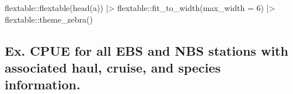 \documentclass[
  letterpaper,
  oneside,
  open=any]{scrbook}
\newenvironment{Shaded}{\begin{snugshade}}{\end{snugshade}}
\newcommand{\AttributeTok}[1]{\textcolor[rgb]{0.40,0.45,0.13}{#1}}
\newcommand{\DecValTok}[1]{\textcolor[rgb]{0.68,0.00,0.00}{#1}}
\newcommand{\FunctionTok}[1]{\textcolor[rgb]{0.28,0.35,0.67}{#1}}
\newcommand{\NormalTok}[1]{\textcolor[rgb]{0.00,0.23,0.31}{#1}}
\newcommand{\SpecialCharTok}[1]{\textcolor[rgb]{0.37,0.37,0.37}{#1}}
\begin{document}
\begin{Shaded}
\begin{Highlighting}[]
\NormalTok{flextable}\SpecialCharTok{::}\FunctionTok{flextable}\NormalTok{(}\FunctionTok{head}\NormalTok{(a)) }\SpecialCharTok{|\textgreater{}} 
\NormalTok{  flextable}\SpecialCharTok{::}\FunctionTok{fit\_to\_width}\NormalTok{(}\AttributeTok{max\_width =} \DecValTok{6}\NormalTok{) }\SpecialCharTok{|\textgreater{}} 
\NormalTok{  flextable}\SpecialCharTok{::}\FunctionTok{theme\_zebra}\NormalTok{()}
\end{Highlighting}
\end{Shaded}

\subsection{Ex. CPUE for all EBS and NBS stations with associated haul,
cruise, and species
information.}\label{ex.-cpue-for-all-ebs-and-nbs-stations-with-associated-haul-cruise-and-species-information.}
\end{document}
